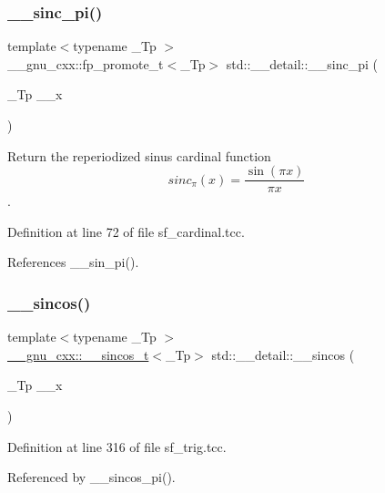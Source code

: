 \subsubsection{\texorpdfstring{\+\_\+\+\_\+sinc\+\_\+pi()}{\_\_sinc\_pi()}}
{\footnotesize\ttfamily template$<$typename \+\_\+\+Tp $>$ \\
\+\_\+\+\_\+gnu\+\_\+cxx\+::fp\+\_\+promote\+\_\+t$<$\+\_\+\+Tp$>$ std\+::\+\_\+\+\_\+detail\+::\+\_\+\+\_\+sinc\+\_\+pi (\begin{DoxyParamCaption}\item[{\+\_\+\+Tp}]{\+\_\+\+\_\+x }\end{DoxyParamCaption})}



Return the reperiodized sinus cardinal function \[ sinc_\pi(x) = \frac{\sin(\pi x)}{\pi x} \]. 



Definition at line 72 of file sf\+\_\+cardinal.\+tcc.



References \+\_\+\+\_\+sin\+\_\+pi().

\mbox{\label{namespacestd_1_1____detail_a59a9ff6922faa1a88da8b485ee9d37cb}} 
\subsubsection{\texorpdfstring{\+\_\+\+\_\+sincos()}{\_\_sincos()}\hspace{0.1cm}{\footnotesize\ttfamily [1/4]}}
{\footnotesize\ttfamily template$<$typename \+\_\+\+Tp $>$ \\
\hyperlink{struct____gnu__cxx_1_1____sincos__t}{\+\_\+\+\_\+gnu\+\_\+cxx\+::\+\_\+\+\_\+sincos\+\_\+t}$<$\+\_\+\+Tp$>$ std\+::\+\_\+\+\_\+detail\+::\+\_\+\+\_\+sincos (\begin{DoxyParamCaption}\item[{\+\_\+\+Tp}]{\+\_\+\+\_\+x }\end{DoxyParamCaption})\hspace{0.3cm}{\ttfamily [inline]}}



Definition at line 316 of file sf\+\_\+trig.\+tcc.



Referenced by \+\_\+\+\_\+sincos\+\_\+pi().

